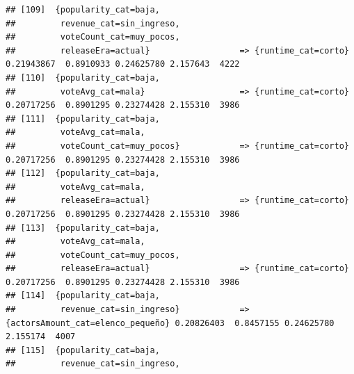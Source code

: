 \documentclass[
]{article}
\begin{document}
\begin{verbatim}
## [109]  {popularity_cat=baja,                                                                                                    
##         revenue_cat=sin_ingreso,                                                                                                
##         voteCount_cat=muy_pocos,                                                                                                
##         releaseEra=actual}                  => {runtime_cat=corto}               0.21943867  0.8910933 0.24625780 2.157643  4222
## [110]  {popularity_cat=baja,                                                                                                    
##         voteAvg_cat=mala}                   => {runtime_cat=corto}               0.20717256  0.8901295 0.23274428 2.155310  3986
## [111]  {popularity_cat=baja,                                                                                                    
##         voteAvg_cat=mala,                                                                                                       
##         voteCount_cat=muy_pocos}            => {runtime_cat=corto}               0.20717256  0.8901295 0.23274428 2.155310  3986
## [112]  {popularity_cat=baja,                                                                                                    
##         voteAvg_cat=mala,                                                                                                       
##         releaseEra=actual}                  => {runtime_cat=corto}               0.20717256  0.8901295 0.23274428 2.155310  3986
## [113]  {popularity_cat=baja,                                                                                                    
##         voteAvg_cat=mala,                                                                                                       
##         voteCount_cat=muy_pocos,                                                                                                
##         releaseEra=actual}                  => {runtime_cat=corto}               0.20717256  0.8901295 0.23274428 2.155310  3986
## [114]  {popularity_cat=baja,                                                                                                    
##         revenue_cat=sin_ingreso}            => {actorsAmount_cat=elenco_pequeño} 0.20826403  0.8457155 0.24625780 2.155174  4007
## [115]  {popularity_cat=baja,                                                                                                    
##         revenue_cat=sin_ingreso,                                                                                                

\end{verbatim}
\end{document}
